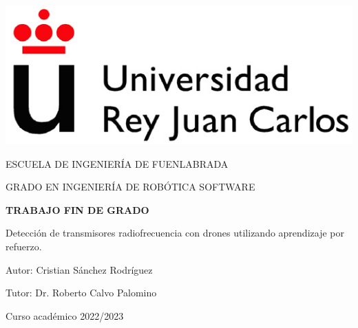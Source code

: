 \thispagestyle{empty}

\begin{titlepage}
	\begin{center}
		\vspace*{3mm}
		\begin{center}
			\includegraphics[width=0.4\linewidth]{imagenes/cap1/logo_urjc}
		\end{center}
		\vspace{6.0mm}
		
		\fontsize{15.5}{14}\selectfont ESCUELA DE INGENIERÍA DE FUENLABRADA
		\vspace{13mm}
		
		\fontsize{14}{14}\selectfont GRADO EN INGENIERÍA DE ROBÓTICA SOFTWARE
		
		\vspace{70pt}
		
		\fontsize{15.7}{14}\selectfont \textbf{TRABAJO FIN DE GRADO} 
		
		\vspace{20mm}
		\begin{LARGE}
			Detección de transmisores radiofrecuencia con drones utilizando aprendizaje por refuerzo.
		\end{LARGE}
		
		\vspace{20mm}
		
		\begin{large}
			Autor: Cristian Sánchez Rodríguez
			
			Tutor: Dr. Roberto Calvo Palomino
			
			\vspace{10mm}
		\end{large}
		\begin{normalsize}
			Curso académico 2022/2023		
		\end{normalsize}
		\vspace{10mm}
		
	\end{center}
	
\end{titlepage}

\thispagestyle{empty}
